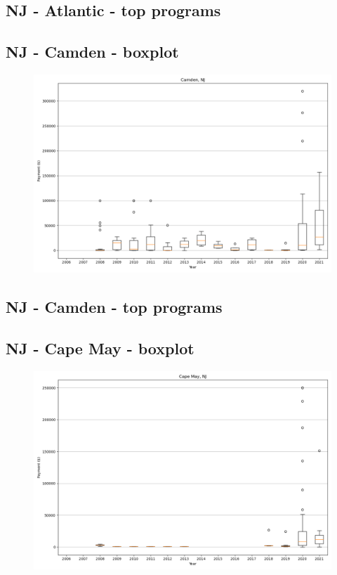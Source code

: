 \subsection*{NJ - Atlantic - top programs}

\newpage
\subsection*{NJ - Camden - boxplot}
\begin{figure}[h]
\centering
\includegraphics[width=7in]{../output/boxplots/counties/Camden-NJ_boxplot.png}
\end{figure}


\subsection*{NJ - Camden - top programs}

\newpage
\subsection*{NJ - Cape May - boxplot}
\begin{figure}[h]
\centering
\includegraphics[width=7in]{../output/boxplots/counties/Cape May-NJ_boxplot.png}
\end{figure}


